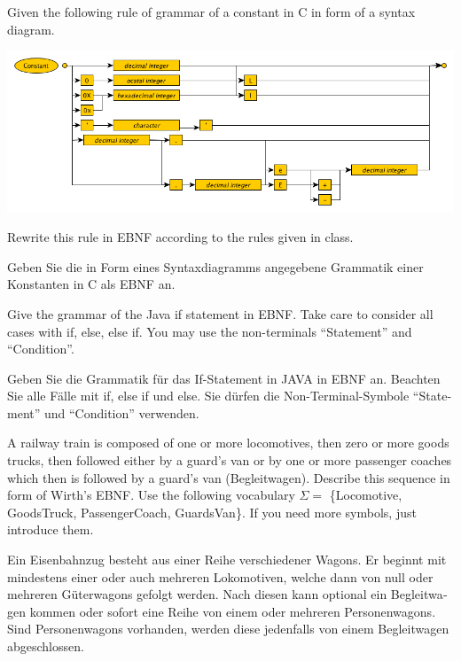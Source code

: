 \documentclass{exam}
\theoremstyle{definition}
\theoremstyle{definition}
\begin{document}
\begin{questions}
Given the following rule of grammar of a constant in C in form of a syntax diagram.
	
\includegraphics[scale=.5]{SyntaxDiagramConstant.png}
	
Rewrite this rule in EBNF according to the rules given in class.

\begin{otherlanguage}{german}
Geben Sie die in Form eines Syntaxdiagramms angegebene Grammatik einer Konstanten in C als EBNF an.
\end{otherlanguage}

	
Give the grammar of the Java if statement in EBNF. Take care to consider all cases with if, else, else if. You may use the non-terminals ``Statement'' and ``Condition''.

\begin{otherlanguage}{german}
	Geben Sie die Grammatik für das If-Statement in JAVA in EBNF an. Beachten Sie alle Fälle mit if, else if und else. Sie dürfen die Non-Terminal-Symbole ``Statement'' und ``Condition'' verwenden.
\end{otherlanguage}

A railway  train is composed of one or more locomotives, then zero or more  goods trucks, then followed either by a guard's van or by one or more passenger coaches which then is followed by a guard's van (Begleitwagen). Describe this sequence in form of Wirth's EBNF. Use the following vocabulary $\Sigma =$ \{Locomotive, GoodsTruck, PassengerCoach, GuardsVan\}. If you need more symbols, just introduce them.

\begin{otherlanguage}{german}
Ein Eisenbahnzug besteht aus einer Reihe verschiedener Wagons. Er beginnt mit mindestens einer oder auch mehreren Lokomotiven, welche dann von null oder mehreren Güterwagons gefolgt werden. Nach diesen kann optional ein Begleitwagen kommen oder sofort eine Reihe von einem oder mehreren Personenwagons. Sind Personenwagons vorhanden, werden diese jedenfalls von einem Begleitwagen abgeschlossen.


\end{otherlanguage}
\end{questions}
\end{document}
